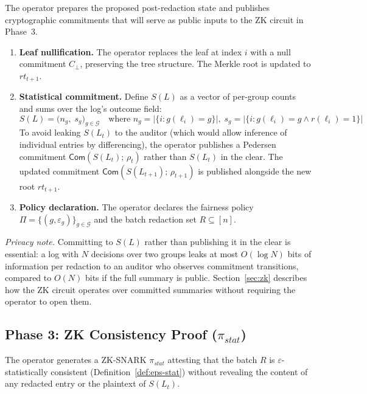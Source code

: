 The operator prepares the proposed post-redaction state and publishes
cryptographic commitments that will serve as public inputs to the ZK circuit
in Phase~3.

\begin{enumerate}
  \item \textbf{Leaf nullification.} The operator replaces the leaf at
  index $i$ with a null commitment $C_{\bot}$, preserving the tree
  structure. The Merkle root is updated to $\mathit{rt}_{t+1}$.
  \item \textbf{Statistical commitment.} Define $S(L)$ as a vector of
  per-group counts and sums over the log's outcome field:
  \[
    S(L) = \bigl(n_g,\; s_g\bigr)_{g \in \mathcal{G}}
    \quad\text{where }n_g = |\{i : g(\ell_i)=g\}|,
    \; s_g = |\{i : g(\ell_i)=g \land r(\ell_i)=1\}|
  \]
  To avoid leaking $S(L_t)$ to the auditor (which would allow inference
  of individual entries by differencing), the operator publishes a
  Pedersen commitment $\mathsf{Com}(S(L_t);\, \rho_t)$ rather than
  $S(L_t)$ in the clear. The updated commitment
  $\mathsf{Com}(S(L_{t+1});\, \rho_{t+1})$ is published alongside the
  new root $\mathit{rt}_{t+1}$.
  \item \textbf{Policy declaration.} The operator declares the fairness
  policy $\Pi = \{(g, \varepsilon_g)\}_{g \in \mathcal{G}}$ and the
  batch redaction set $R \subseteq [n]$.
\end{enumerate}

\noindent \emph{Privacy note.} Committing to $S(L)$ rather than publishing
it in the clear is essential: a log with $N$ decisions over two groups
leaks at most $O(\log N)$ bits of information per redaction to an auditor
who observes commitment transitions, compared to $O(N)$ bits if the full
summary is public. Section~\ref{sec:zk} describes how the ZK circuit
operates over committed summaries without requiring the operator to open them.

\subsection{Phase 3: ZK Consistency Proof ($\pi_{\mathit{stat}}$)}
\label{subsec:zk}

The operator generates a ZK-SNARK $\pi_{\mathit{stat}}$ attesting that the
batch $R$ is $\varepsilon$-statistically consistent
(Definition~\ref{def:eps-stat}) without revealing the content of any
redacted entry or the plaintext of $S(L_t)$.


